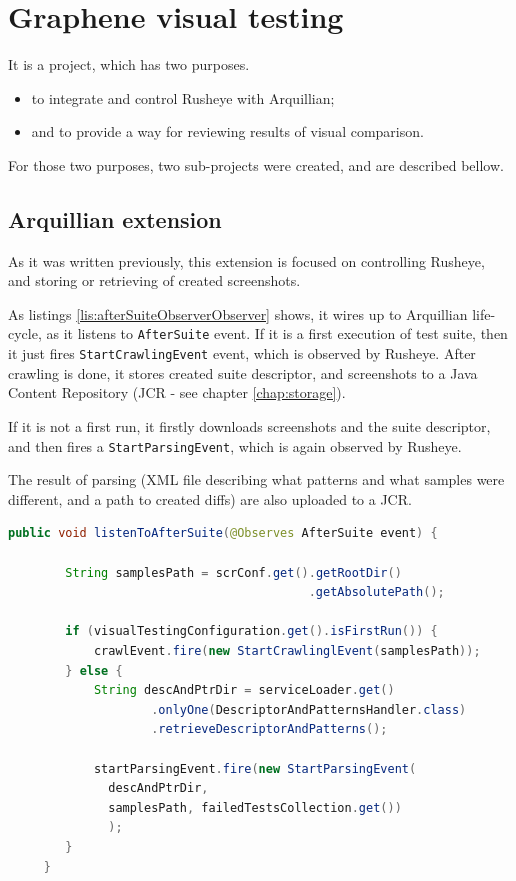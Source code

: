 \documentclass[11pt,oneside,final]{fithesis2}
\begin{document}
\section{Graphene visual testing}
    It is a project, which has two purposes.
    \begin{itemize}
     \item to integrate and control Rusheye with Arquillian;
     \item and to provide a way for reviewing results of visual comparison.
    \end{itemize}

    For those two purposes, two sub-projects were created, and are described bellow.
    
    \subsection{Arquillian extension}
    \label{sec:arqExt}
    As it was written previously, this extension is focused on controlling Rusheye, and storing or retrieving of created screenshots.
    
    As listings \ref{lis:afterSuiteObserverObserver} shows, it wires up to Arquillian life-cycle, as it listens to \texttt{AfterSuite} event. 
    If it is a first execution of test suite, then it just fires \texttt{StartCrawlingEvent} event, which is observed by Rusheye. 
    After crawling is done, it stores created suite descriptor, and screenshots to a Java Content Repository 
    (JCR - see chapter \ref{chap:storage}).
    
    If it is not a first run, it firstly downloads screenshots and the suite descriptor, and then fires a \texttt{StartParsingEvent}, 
    which is again observed by Rusheye.
    
    The result of parsing (XML file describing what patterns and what samples were different, and a path to created diffs) are also uploaded
    to a JCR.
    
    \begin{lstlisting}[caption=AfterSuite observer to controll Rusheye,label=lis:afterSuiteObserverObserver,language=java, breaklines=true]
     public void listenToAfterSuite(@Observes AfterSuite event) {
        
        String samplesPath = scrConf.get().getRootDir()
                                          .getAbsolutePath();
        
        if (visualTestingConfiguration.get().isFirstRun()) {
            crawlEvent.fire(new StartCrawlinglEvent(samplesPath));
        } else {
            String descAndPtrDir = serviceLoader.get()
                    .onlyOne(DescriptorAndPatternsHandler.class)
                    .retrieveDescriptorAndPatterns();
            
            startParsingEvent.fire(new StartParsingEvent(
		      descAndPtrDir,
		      samplesPath, failedTestsCollection.get())
		      );
        }
     }
    \end{lstlisting}
    
\end{document}
